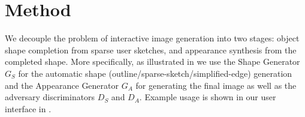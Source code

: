 \section{Method}
We decouple the problem of interactive image generation into two stages: object shape completion from sparse user sketches, and appearance synthesis from the completed shape. More specifically, as illustrated in  we use the Shape Generator $G_S$ for the automatic shape (outline/sparse-sketch/simplified-edge) generation and the Appearance Generator $G_A$ for generating the final image as well as the adversary discriminators $D_S$ and $D_A$. Example usage is shown in our user interface in .

